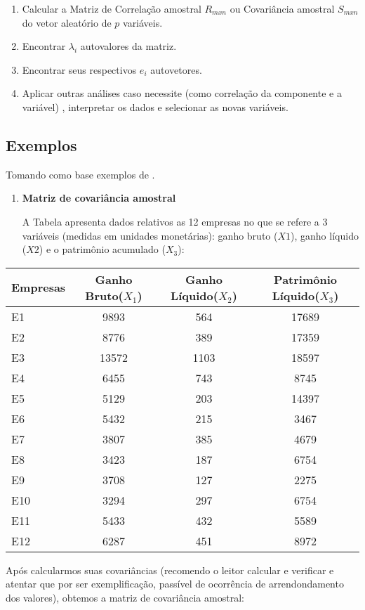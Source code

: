 \documentclass[
  openany]{book}
\begin{document}
\begin{enumerate}
\def\labelenumi{\arabic{enumi}.}
\item
  Calcular a Matriz de Correlação amostral \(R_{mxn}\) ou Covariância amostral \(S_{mxn}\) do vetor aleatório de \(p\) variáveis.
\item
  Encontrar \(\lambda_i\) autovalores da matriz.
\item
  Encontrar seus respectivos \(e_i\) autovetores.
\item
  Aplicar outras análises caso necessite (como correlação da componente e a variável) , interpretar os dados e selecionar as novas variáveis.
\end{enumerate}

\hypertarget{exemplocp}{%
\subsection{Exemplos}\label{exemplocp}}

Tomando como base exemplos de \citet{mingoti2007analise}.

\begin{enumerate}
\def\labelenumi{\arabic{enumi}.}
\item
  \textbf{Matriz de covariância amostral}

  A Tabela apresenta dados relativos as 12 empresas no que se refere a 3 variáveis (medidas em unidades monetárias): ganho bruto (\(X1\)), ganho líquido (\(X2\)) e o patrimônio acumulado (\(X_3\)):
\end{enumerate}

\begin{longtable}[]{@{}lccc@{}}
\toprule
\textbf{Empresas} & \textbf{Ganho Bruto(\(X_1\))} & \textbf{Ganho Líquido(\(X_2\))} & \textbf{Patrimônio Líquido(\(X_3\))}\tabularnewline
\midrule
\endhead
E1 & 9893 & 564 & 17689\tabularnewline
E2 & 8776 & 389 & 17359\tabularnewline
E3 & 13572 & 1103 & 18597\tabularnewline
E4 & 6455 & 743 & 8745\tabularnewline
E5 & 5129 & 203 & 14397\tabularnewline
E6 & 5432 & 215 & 3467\tabularnewline
E7 & 3807 & 385 & 4679\tabularnewline
E8 & 3423 & 187 & 6754\tabularnewline
E9 & 3708 & 127 & 2275\tabularnewline
E10 & 3294 & 297 & 6754\tabularnewline
E11 & 5433 & 432 & 5589\tabularnewline
E12 & 6287 & 451 & 8972\tabularnewline
\bottomrule
\end{longtable}

Após calcularmos suas covariâncias (recomendo o leitor calcular e verificar e atentar que por ser exemplificação, passível de ocorrência de arrendondamento dos valores), obtemos a matriz de covariância amostral:
\end{document}
